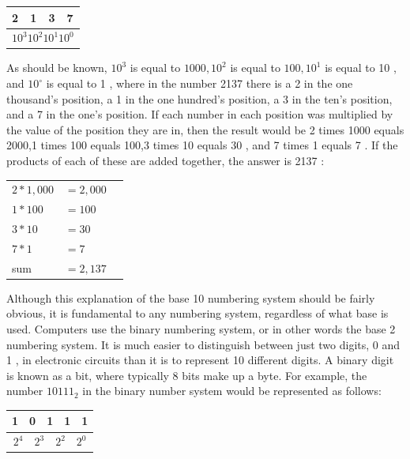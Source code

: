 \documentclass[10pt]{article}
\begin{document}
\begin{center}
\begin{tabular}{|l|l|l|l|}
\hline
2 & 1 & 3 & 7 \\
\hline
\multicolumn{4}{|c|}{$10^{3} 10^{2} 10^{1} 10^{0}$} \\
\hline
\end{tabular}
\end{center}

As should be known, $10^{3}$ is equal to $1000,10^{2}$ is equal to $100,10^{1}$ is equal to 10 , and $10^{\circ}$ is equal to 1 , where in the number 2137 there is a 2 in the one thousand's position, a 1 in the one hundred's position, a 3 in the ten's position, and a 7 in the one's position. If each number in each position was multiplied by the value of the position they are in, then the result would be 2 times 1000 equals 2000,1 times 100 equals 100,3 times 10 equals 30 , and 7 times 1 equals 7 . If the products of each of these are added together, the answer is 2137 :

\begin{center}
\begin{tabular}{llr}
$2 * 1,000$ & $=2,000$ \\
$1 * 100$ & $=100$ \\
$3 * 10$ & $=30$ \\
$7 * 1$ & $=7$ \\
\hline
sum & $=2,137$ \\
\hline
\end{tabular}
\end{center}

Although this explanation of the base 10 numbering system should be fairly obvious, it is fundamental to any numbering system, regardless of what base is used. Computers use the binary numbering system, or in other words the base 2 numbering system. It is much easier to distinguish between just two digits, 0 and 1 , in electronic circuits than it is to represent 10 different digits. A binary digit is known as a bit, where typically 8 bits make up a byte. For example, the number $10111_{2}$ in the binary number system would be represented as follows:

\begin{center}
\begin{tabular}{|l|l|l|l|l|}
\hline
1 & 0 & 1 & 1 & 1 \\
\hline
\multicolumn{5}{c}{$2^{4} \quad 2^{3} \quad 2^{2} \quad 2^{0}$} \\
\hline
\end{tabular}
\end{center}
\end{document}

